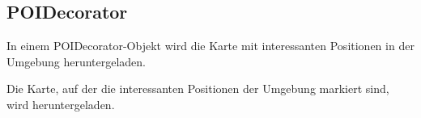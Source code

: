 \documentclass[entwurf.tex]{subfiles}
\begin{document}
		\subsection{POIDecorator}
			In einem POIDecorator-Objekt wird die Karte mit interessanten Positionen in
			der Umgebung heruntergeladen.
				\begin{description}
				Die Karte, auf der die interessanten Positionen der Umgebung markiert sind,
				wird heruntergeladen.
				\end{description}
\end{document}

